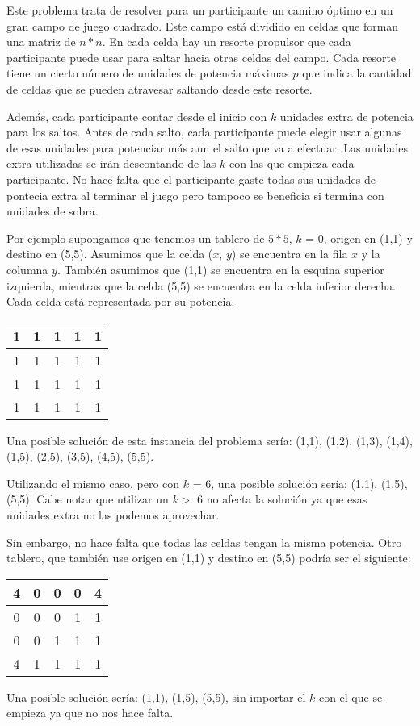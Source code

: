 Este problema trata de resolver para un participante un camino óptimo en un gran campo de juego cuadrado. Este campo está dividido en celdas que forman una matriz de $n * n$. En cada celda hay un resorte propulsor que cada participante puede usar para saltar hacia otras celdas del campo. Cada resorte tiene un cierto número de unidades de potencia máximas $p$ que indica la cantidad de celdas que se pueden atravesar saltando desde este resorte.

Además, cada participante contar desde el inicio con $k$ unidades extra de potencia para los saltos. Antes de cada salto, cada participante puede elegir usar algunas de esas unidades para potenciar más aun el salto que va a efectuar. Las unidades extra utilizadas se irán descontando de las $k$ con las que empieza cada participante. No hace falta que el participante gaste todas sus unidades de pontecia extra al terminar el juego pero tampoco se beneficia si termina con unidades de sobra.

Por ejemplo supongamos que tenemos un tablero de $5*5$, $k$ = 0, origen en (1,1) y destino en (5,5). Asumimos que la celda ($x$, $y$) se encuentra en la fila $x$ y la columna $y$. También asumimos que (1,1) se encuentra en la esquina superior izquierda, mientras que la celda (5,5) se encuentra en la celda inferior derecha. Cada celda está representada por su potencia.
\begin{center}
\begin{tabular}{|c|c|c|c|c|}
\hline
 1 & 1 & 1 & 1 & 1 \\
 \hline
 1 & 1 & 1 & 1 & 1 \\
 \hline
 1 & 1 & 1 & 1 & 1 \\
 \hline
 1 & 1 & 1 & 1 & 1 \\
 \hline
\end{tabular}
\end{center}

Una posible solución de esta instancia del problema sería: (1,1), (1,2), (1,3), (1,4), (1,5), (2,5), (3,5), (4,5), (5,5).

Utilizando el mismo caso, pero con $k$ = 6, una posible solución sería: (1,1), (1,5), (5,5). Cabe notar que utilizar un $k >$ 6 no afecta la solución ya que esas unidades extra no las podemos aprovechar.

Sin embargo, no hace falta que todas las celdas tengan la misma potencia. Otro tablero, que también use origen en (1,1) y destino en (5,5) podría ser el siguiente:
\begin{center}
\begin{tabular}{|c|c|c|c|c|}
\hline
 4 & 0 & 0 & 0 & 4 \\
 \hline
 0 & 0 & 0 & 1 & 1 \\
 \hline
 0 & 0 & 1 & 1 & 1 \\
 \hline
 4 & 1 & 1 & 1 & 1 \\
 \hline
\end{tabular}
\end{center}

Una posible solución sería: (1,1), (1,5), (5,5), sin importar el $k$ con el que se empieza ya que no nos hace falta.